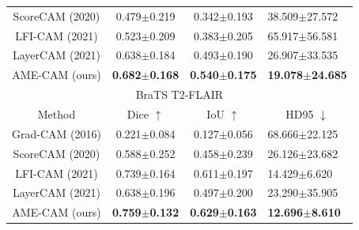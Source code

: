 \begin{table}
\begin{tabular}{c|c|c|l}
ScoreCAM (2020) & 0.479$\pm$0.219    & 0.342$\pm$0.193   & 38.509$\pm$27.572                        \\
LFI-CAM (2021)  & 0.523$\pm$0.209    & 0.383$\pm$0.205   & 65.917$\pm$56.581                        \\
LayerCAM (2021) & 0.638$\pm$0.184    & 0.493$\pm$0.190   & 26.907$\pm$33.535                        \\
AME-CAM  (ours) & \textbf{0.682$\pm$0.168}    & \textbf{0.540$\pm$0.175}   & \textbf{19.078$\pm$24.685}                        \\ \hline
\multicolumn{4}{c}{BraTS T2-FLAIR} \\ \hline
Method          & Dice $\uparrow$ & IoU $\uparrow$ & \multicolumn{1}{c}{HD95 $\downarrow$} \\ \hline
Grad-CAM (2016) & 0.221$\pm$0.084    & 0.127$\pm$0.056   & 68.666$\pm$22.125                        \\
ScoreCAM (2020) & 0.588$\pm$0.252    & 0.458$\pm$0.239   & 26.126$\pm$23.682                        \\
LFI-CAM (2021)  & 0.739$\pm$0.164    & 0.611$\pm$0.197   & 14.429$\pm$6.620                         \\
LayerCAM (2021) & 0.638$\pm$0.196    & 0.497$\pm$0.200   & 23.290$\pm$35.905                        \\
AME-CAM  (ours) & \textbf{0.759$\pm$0.132}    & \textbf{0.629$\pm$0.163}   & \textbf{12.696$\pm$8.610}                         \\ \hline
\end{tabular}
\end{table}

